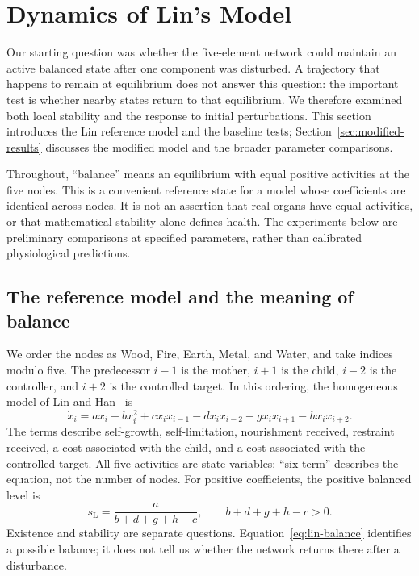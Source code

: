 \FloatBarrier
\section{Dynamics of Lin's Model}
\label{sec:lin-results}

Our starting question was whether the five-element network could maintain
an active balanced state after one component was disturbed. A trajectory
that happens to remain at equilibrium does not answer this question: the
important test is whether nearby states return to that equilibrium. We
therefore examined both local stability and the response to initial
perturbations. This section introduces the Lin reference model and the
baseline tests; Section~\ref{sec:modified-results} discusses the modified
model and the broader parameter comparisons.

Throughout, ``balance'' means an equilibrium with equal positive activities
at the five nodes. This is a convenient reference state for a model whose
coefficients are identical across nodes. It is not an assertion that real
organs have equal activities, or that mathematical stability alone defines
health. The experiments below are preliminary comparisons at specified
parameters, rather than calibrated physiological predictions.

\subsection{The reference model and the meaning of balance}
We order the nodes as Wood, Fire, Earth, Metal, and Water, and take indices
modulo five. The predecessor $i-1$ is the mother, $i+1$ is the child,
$i-2$ is the controller, and $i+2$ is the controlled target. In this
ordering, the homogeneous model of Lin and Han~\cite{Lin2020} is
\begin{equation}
 \dot x_i=a x_i-bx_i^2+c x_i x_{i-1}-d x_i x_{i-2}
                 -g x_i x_{i+1}-h x_i x_{i+2}.
 \label{eq:lin-model}
\end{equation}
The terms describe self-growth, self-limitation, nourishment received,
restraint received, a cost associated with the child, and a cost associated
with the controlled target. All five activities are state variables;
``six-term'' describes the equation, not the number of nodes.
For positive coefficients, the positive balanced level is
\begin{equation}
 s_{\mathrm L}=\frac{a}{b+d+g+h-c},
 \qquad b+d+g+h-c>0.
 \label{eq:lin-balance}
\end{equation}
Existence and stability are separate questions. Equation~\eqref{eq:lin-balance}
identifies a possible balance; it does not tell us whether the network
returns there after a disturbance.

